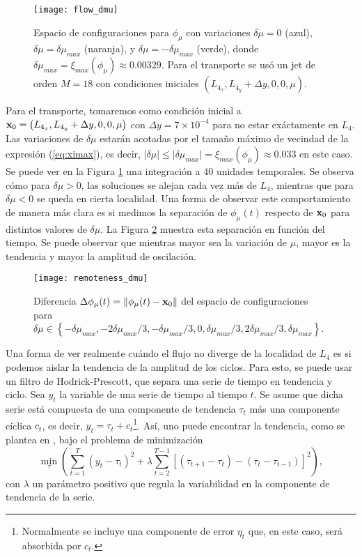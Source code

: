\begin{figure}
 \centering
 \texttt{[image: flow\_dmu]}
 \caption{Espacio de configuraciones para $\phi_\mu$ con variaciones $\delta\mu = 0$ (azul), $\delta\mu = \delta\mu_{max}$ (naranja), y $\delta\mu = -\delta\mu_{max}$ (verde), donde $\delta\mu_{max} = \xi_{max}(\phi_\mu) \approx 0.00329$. Para el transporte se usó un jet de orden $M=18$ con condiciones iniciales $\left( L_{4_x}, L_{4_y} + \Delta y, 0, 0, \mu \right)$.}
 \label{fig:flow_dmu}
\end{figure}

Para el transporte, tomaremos como condición inicial a $\mathbf{x}_0 = \left( L_{4_x}, L_{4_y} + \Delta y, 0, 0, \mu \right)$ con $\Delta y = 7\times 10^{-4}$ para no estar exáctamente en $L_4$. Las variaciones de $\delta\mu$ estarán acotadas por el tamaño máximo de vecindad de la expresión (\ref{eq:ximax}), es decir, $\lvert \delta\mu \rvert \leq \lvert \delta\mu_{max} \rvert = \xi_{max}(\phi_\mu) \approx 0.033$ en este caso. Se puede ver en la Figura \ref{fig:flow_dmu} una integración a $40$ unidades temporales. Se observa cómo para $\delta \mu > 0$, las soluciones se alejan cada vez más de $L_4$, mientras que para $\delta \mu < 0$ se queda en cierta localidad. Una forma de observar este comportamiento de manera más clara es si medimos la separación de $\phi_\mu(t)$ respecto de $\mathbf{x}_0$ para distintos valores de $\delta \mu$. La Figura \ref{fig:remoteness_dmu} muestra esta separación en función del tiempo. Se puede observar que mientras mayor sea la variación de $\mu$, mayor es la tendencia y mayor la amplitud de oscilación. 

\begin{figure}
 \centering
 \texttt{[image: remoteness\_dmu]}
 \caption{Diferencia $\Delta\phi_\mu(t) = \left\lVert \phi_\mu(t) - \mathbf{x}_0 \right\rVert$ del espacio de configuraciones para $\delta\mu \in \left\lbrace -\delta\mu_{max}, -2\delta\mu_{max}/3, -\delta\mu_{max}/3, 0, \delta\mu_{max}/3, 2\delta\mu_{max}/3, \delta\mu_{max}  \right\rbrace$.}
 \label{fig:remoteness_dmu}
\end{figure}

Una forma de ver realmente cuándo el flujo no diverge de la localidad de $L_4$ es si podemos aislar la tendencia de la amplitud de los ciclos. Para esto, se puede usar un filtro de Hodrick-Prescott, que separa una serie de tiempo en tendencia y ciclo. Sea $y_t$ la variable de una serie de tiempo al tiempo $t$. Se asume que dicha serie está compuesta de una componente de tendencia $\tau_t$ más una componente cíclica $c_t$, es decir, $y_t = \tau_t + c_t$\footnote{Normalmente se incluye una componente de error $\eta_t$ que, en este caso, será absorbida por $c_t$.}. Así, uno puede encontrar la tendencia, como se plantea en \cite{Hodrick1997}, bajo el problema de minimización
\begin{equation}
 \min_{\tau} \left( \sum_{t=1}^T (y_t - \tau_t)^2 + \lambda \sum_{t=2}^{T-1} \left[ (\tau_{t+1} - \tau_t) - (\tau_t - \tau_{t-1}) \right]^2 \right),
 \label{eq:hp-filter}
\end{equation} 
con $\lambda$ un parámetro positivo que regula la variabilidad en la componente de tendencia de la serie.

